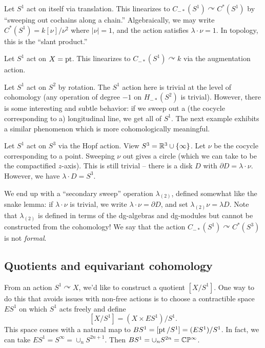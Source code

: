 \documentclass{article}
\begin{document}
\begin{ex}
  Let $S^1$ act on itself via translation.
  This linearizes to $C_{-*}(S^1) \curvearrowright C^{*}(S^1)$ by ``sweeping out cochains along a chain.''
  Algebraically, we may write $C^*(S^1) = k[\nu] / \nu^2$ where $|\nu| = 1$, and the action satisfies $\lambda \cdot \nu = 1$.
  In topology, this is the ``slant product.''
\end{ex}

\begin{ex}
  Let $S^1$ act on $X = \operatorname{pt}$.
  This linearizes to $C_{-*}(S^1) \curvearrowright k$ via the augmentation action.
\end{ex}

\begin{ex}
  Let $S^1$ act on $S^2$ by rotation.
  The $S^1$ action here is trivial at the level of cohomology (any operation of degree $-1$ on $H_{-*}(S^2)$ is trivial).
  However, there is some interesting and subtle behavior: if we sweep out a (the cocycle corresponding to a) longitudinal line, we get all of $S^1$.
  The next example exhibits a similar phenomenon which is more cohomologically meaningful.
\end{ex}

\begin{ex}
  Let $S^1$ act on $S^3$ via the Hopf action.
  View $S^3 = \mathbb{R}^3 \cup \{ \infty \}$.
  Let $\nu$ be the cocycle corresponding to a point.
  Sweeping $\nu$ out gives a circle (which we can take to be the compactified $z$-axis).
  This is still trivial -- there is a disk $D$ with $\partial D = \lambda \cdot \nu$.
  However, we have $\lambda \cdot D = S^3$.
  
  We end up with a ``secondary sweep'' operation $\lambda_{(2)}$, defined somewhat like the snake lemma: if $\lambda \cdot \nu$ is trivial, we write $\lambda \cdot \nu = \partial D$, and set $\lambda_{(2)} \nu = \lambda D$.
  Note that $\lambda_{(2)}$ is defined in terms of the dg-algebras and dg-modules but cannot be constructed from the cohomology!
  We say that the action $C_{-*}(S^1) \curvearrowright C^*(S^3)$ is not \emph{formal}.
\end{ex}

\subsection{Quotients and equivariant cohomology}

From an action $S^1 \curvearrowright X$, we'd like to construct a quotient $[X / S^1]$.
One way to do this that avoids issues with non-free actions is to choose a contractible space $ES^1$ on which $S^1$ acts freely and define
\[
  [X / S^1] = (X \times ES^1) / S^1.
\]
This space comes with a natural map to $BS^1 = [\operatorname{pt} / S^1] = (ES^1) / S^1$.
In fact, we can take $ES^1 = S^\infty = \cup_n S^{2n+1}$.
Then $BS^1 = \cup_n S^{2n} = \mathbb{C}\mathbb{P}^\infty$.
\end{document}
